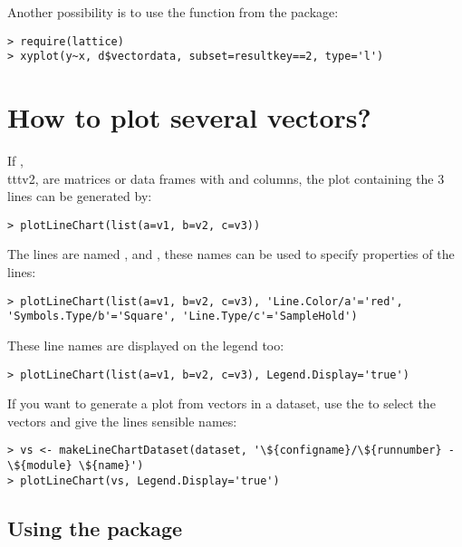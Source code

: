 Another possibility is to use the  function from the  package:

\begin{verbatim}
> require(lattice)
> xyplot(y~x, d$vectordata, subset=resultkey==2, type='l')
\end{verbatim}



\section{How to plot several vectors?}

If , \\ttt{v2},  are matrices or data frames with  and  columns,
the plot containing the 3 lines can be generated by:

\begin{verbatim}
> plotLineChart(list(a=v1, b=v2, c=v3))
\end{verbatim}

The lines are named ,  and , these names can be used to specify
properties of the lines:

\begin{verbatim}
> plotLineChart(list(a=v1, b=v2, c=v3), 'Line.Color/a'='red', 'Symbols.Type/b'='Square', 'Line.Type/c'='SampleHold')
\end{verbatim}

These line names are displayed on the legend too:

\begin{verbatim}
> plotLineChart(list(a=v1, b=v2, c=v3), Legend.Display='true')
\end{verbatim}

If you want to generate a plot from vectors in a dataset, use the  to select
the vectors and give the lines sensible names:

\begin{verbatim}
> vs <- makeLineChartDataset(dataset, '\${configname}/\${runnumber} - \${module} \${name}')
> plotLineChart(vs, Legend.Display='true')
\end{verbatim}

\subsection{Using the  package}

